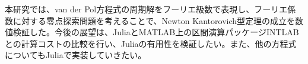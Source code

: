 
%
本研究では、van der Pol方程式の周期解をフーリエ級数で表現し、フーリエ係数に対する零点探索問題を考えることで、Newton Kantorovich型定理の成立を数値検証した。今後の展望は、JuliaとMATLAB上の区間演算パッケージINTLABとの計算コストの比較を行い、Juliaの有用性を検証したい。また、他の方程式についてもJuliaで実装していきたい。
%